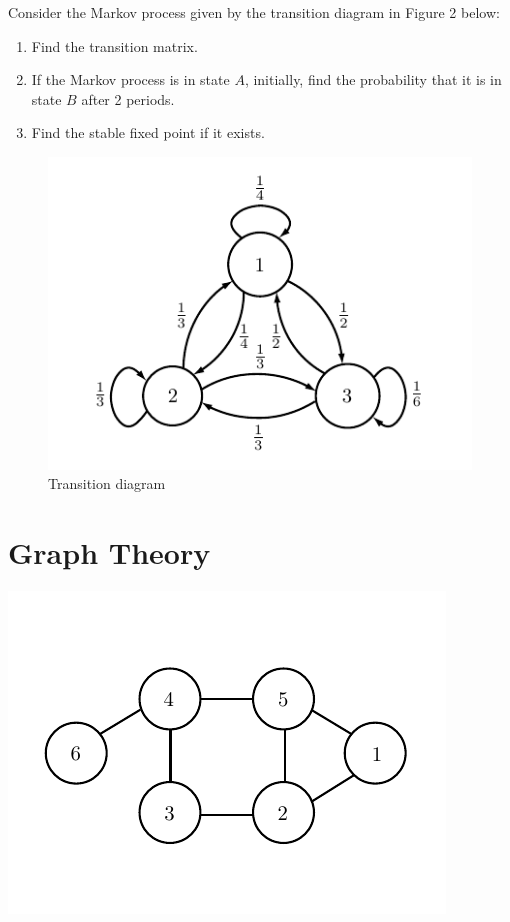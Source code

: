 \begin{problem}
Consider the Markov process given by the transition diagram in Figure 2 below:
\begin{enumerate}
\item Find the transition matrix.
\item If the Markov process is in state $A$, initially, find the probability that it is in state $B$ after 2 periods.
\item Find the stable fixed point if it exists.
\end{enumerate}
\end{problem}

\begin{figure}[h!]
\begin{center}
\includegraphics[scale = 1]{markov2}
\end{center}
\caption{Transition diagram}
\end{figure}

\newpage

\section*{Graph Theory}
\begin{center}
\includegraphics[scale = .8]{graphExample}
\end{center}

